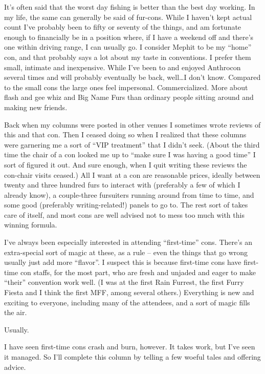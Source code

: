 
It's often said that the worst day fishing is better than the best day working. In my life, the same can generally be said of fur-cons. While I haven't kept actual count I've probably been to fifty or seventy of the things, and am fortunate enough to financially be in a position where, if I have a weekend off and there's one within driving range, I can usually go. I consider Mephit to be my ``home'' con, and that probably says a lot about my taste in conventions. I prefer them small, intimate and inexpensive. While I've been to and enjoyed Anthrocon several times and will probably eventually be back, well\ldots I don't know. Compared to the small cons the large ones feel impersonal. Commercialized. More about flash and gee whiz and Big Name Furs than ordinary people sitting around and making new friends.

Back when my columns were posted in other venues I sometimes wrote reviews of this and that con. Then I ceased doing so when I realized that these columns were garnering me a sort of ``VIP treatment'' that I didn't seek. (About the third time the chair of a con looked me up to ``make sure I was having a good time'' I sort of figured it out. And sure enough, when I quit writing these reviews the con-chair visits ceased.) All I want at a con are reasonable prices, ideally between twenty and three hundred furs to interact with (preferably a few of which I already know), a couple-three fursuiters running around from time to time, and some good (preferably writing-related!) panels to go to. The rest sort of takes care of itself, and most cons are well advised not to mess too much with this winning formula.

I've always been especially interested in attending ``first-time'' cons. There's an extra-special sort of magic at these, as a rule -- even the things that go wrong usually just add more ``flavor''. I suspect this is because first-time cons have first-time con staffs, for the most part, who are fresh and unjaded and eager to make ``their'' convention work well. (I was at the first Rain Furrest, the first Furry Fiesta and I think the first MFF, among several others.) Everything is new and exciting to everyone, including many of the attendees, and a sort of magic fills the air.

Usually.

I have seen first-time cons crash and burn, however. It takes work, but I've seen it managed. So I'll complete this column by telling a few woeful tales and offering advice.

